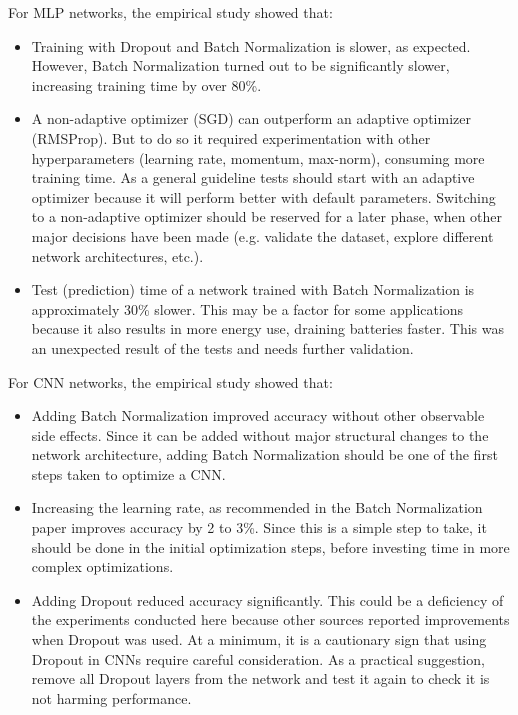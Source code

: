 \documentclass[../dropout-vs-batch-normalization.tex]{subfiles}
\begin{document}
For MLP networks, the empirical study showed that:
\begin{itemize}
\item Training with Dropout and Batch Normalization is slower, as expected. However, Batch Normalization turned out to be significantly slower, increasing training time by over 80\%.
\item A non-adaptive optimizer (SGD) can outperform an adaptive optimizer (RMSProp). But to do so it required experimentation with other hyperparameters (learning rate, momentum, max-norm), consuming more training time. As a general guideline tests should start with an adaptive optimizer because it will perform better with default parameters. Switching to a non-adaptive optimizer should be reserved for a later phase, when other major decisions have been made (e.g. validate the dataset, explore different network architectures, etc.).
\item Test (prediction) time of a network trained with Batch Normalization is approximately 30\% slower. This may be a factor for some applications because it also results in more energy use, draining batteries faster. This was an unexpected result of the tests and needs further validation.
\end{itemize}

For CNN networks, the empirical study showed that:
\begin{itemize}
\item Adding Batch Normalization improved accuracy without other observable side effects. Since it can be added without major structural changes to the network architecture, adding Batch Normalization should be one of the first steps taken to optimize a CNN.
\item Increasing the learning rate, as recommended in the Batch Normalization paper \cite{Ioffe2015} improves accuracy by 2 to 3\%. Since this is a simple step to take, it should be done in the initial optimization steps, before investing time in more complex optimizations.
\item Adding Dropout reduced accuracy significantly. This could be a deficiency of the experiments conducted here because other sources reported improvements when Dropout was used. At a minimum, it is a cautionary sign that using Dropout in CNNs require careful consideration. As a practical suggestion, remove all Dropout layers from the network and test it again to check it is not harming performance.
\end{itemize}
\end{document}
